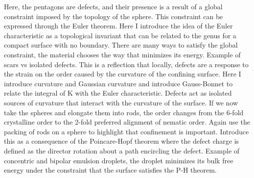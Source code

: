 Here, the pentagons are defects, and their presence is a result of a global constraint imposed by the topology of the sphere.
This constraint can be expressed through the Euler theorem.
Here I introduce the idea of the Euler characteristic as a topological invariant that can be related to the genus for a compact surface with no boundary.
There are many ways to satisfy the global constraint, the material chooses the way that minimizes its energy.
Example of scars vs isolated defects.
This is a reflection that locally, defects are a response to the strain on the order caused by the curvature of the confining surface.
Here I introduce curvature and Gaussian curvature and introduce Gauss-Bonnet to relate the integral of K with the Euler characteristic.
Defects act as isolated sources of curvature that interact with the curvature of the surface.
If we now take the spheres and elongate them into rods, the order changes from the 6-fold crystalline order to the 2-fold preferred alignment of nematic order.
Again use the packing of rods on a sphere to highlight that confinement is important.
Introduce this as a consequence of the Poincare-Hopf theorem where the defect charge is defined as the director rotation about a path encircling the defect.
Example of concentric and bipolar emulsion droplets, the droplet minimizes its bulk free energy under the constraint that the surface satisfies the P-H theorem.\\

